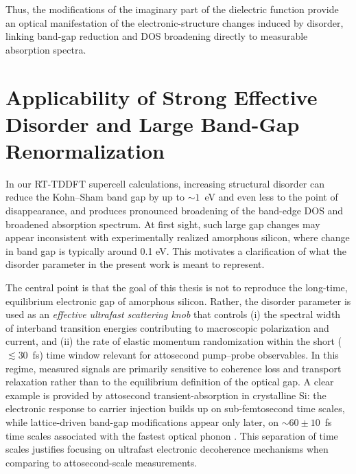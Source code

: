 Thus, the modifications of the imaginary part of the dielectric function provide an optical manifestation of the electronic-structure changes induced by disorder, linking band-gap reduction and DOS broadening directly to measurable absorption spectra.



\section{Applicability of Strong Effective Disorder and Large Band-Gap Renormalization}
\label{sec:applicability_effective_disorder}

In our RT-TDDFT supercell calculations, increasing structural disorder can reduce the Kohn--Sham band gap by up to $\sim 1$~eV and even less to the point of disappearance, and produces pronounced broadening of the band-edge DOS and broadened absorption spectrum. At first sight, such large gap changes may appear inconsistent with experimentally realized amorphous silicon, where change in band gap is typically around 0.1 eV. This motivates a clarification of what the disorder parameter in the present work is meant to represent.

The central point is that the goal of this thesis is not to reproduce the long-time, equilibrium electronic gap of amorphous silicon. Rather, the disorder parameter is used as an \emph{effective ultrafast scattering knob} that controls (i) the spectral width of interband transition energies contributing to macroscopic polarization and current, and (ii) the rate of elastic momentum randomization within the short ($\lesssim 30$~fs) time window relevant for attosecond pump--probe observables.
In this regime, measured signals are primarily sensitive to coherence loss and transport relaxation rather than to the equilibrium definition of the optical gap. A clear example is provided by attosecond transient-absorption in crystalline Si: the electronic response to carrier injection builds up on sub-femtosecond time scales, while lattice-driven band-gap modifications appear only later, on $\sim 60\pm 10$~fs time scales associated with the fastest optical phonon \cite{Schultze2014Si}. This separation of time scales justifies focusing on ultrafast electronic decoherence mechanisms when comparing to attosecond-scale measurements.

